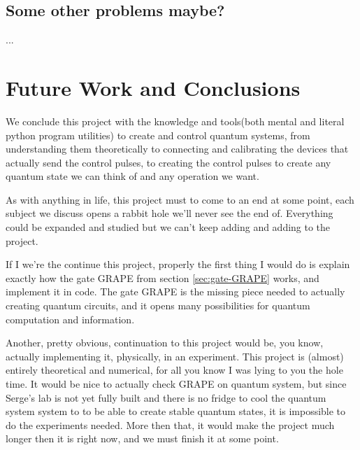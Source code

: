 \documentclass[english, a4paper, 12pt, twoside]{article}
\numberwithin{equation}{section} %
\begin{document}
\subsection{Some other problems maybe?}
...

\newpage
\section{Future Work and Conclusions}
We conclude this project with the knowledge and tools(both mental and literal python program utilities) to create and control quantum systems, from understanding them theoretically to connecting and calibrating the devices that actually send the control pulses, to creating the control pulses to create any quantum state we can think of and any operation we want.

As with anything in life, this project must to come to an end at some point, each subject we discuss opens a rabbit hole we'll never see the end of. Everything could be expanded and studied but we can't keep adding and adding to the project.

If I we're the continue this project, properly the first thing I would do is explain exactly how the gate GRAPE from section \ref{sec:gate-GRAPE} works, and implement it in code. The gate GRAPE is the missing piece needed to actually creating quantum circuits, and it opens many possibilities for quantum computation and information.

Another, pretty obvious, continuation to this project would be, you know, actually implementing it, physically, in an experiment. This project is (almost) entirely theoretical and numerical, for all you know I was lying to you the hole time. It would be nice to actually check GRAPE on quantum system, but since Serge's lab is not yet fully built and there is no fridge to cool the quantum system system to to be able to create stable quantum states, it is impossible to do the experiments needed. More then that, it would make the project much longer then it is right now, and we must finish it at some point.



\appendix
\end{document}
